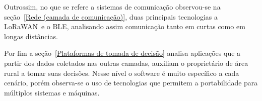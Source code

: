 \documentclass[
article,			%
12pt,				%
oneside,			%
a4paper,			%
english,			%
brazil,				%
sumario=tradicional
]{abntex2}
\begin{document}
Outrossim, no que se refere a sistemas de comunicação observou-se na seção~\ref{Rede (camada de comunicação)}, duas principais tecnologias a LoRaWAN\texttrademark~e o BLE, analisando assim comunicação tanto em curtas como em longas distâncias.

Por fim a seção~\ref{Plataformas de tomada de decisão} analisa aplicações que a partir dos dados coletados nas outras camadas, auxiliam o proprietário de área rural a tomar suas decisões. Nesse nível o software é muito específico a cada cenário, porém observa-se o uso de tecnologias que permitem a portabilidade para múltiplos sistemas e máquinas.


\postextual


\end{document}
